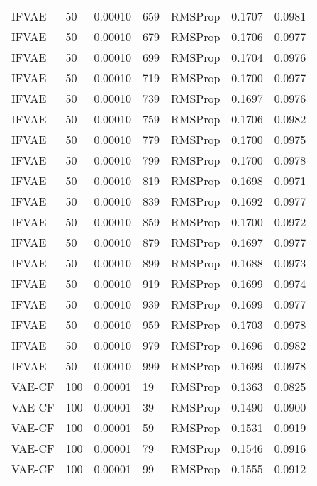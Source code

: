 \begin{tabular}{llrllrr}
   IFVAE &   50 &  0.00010 &   659 &   RMSProp &  0.1707 &       0.0981 \\
   IFVAE &   50 &  0.00010 &   679 &   RMSProp &  0.1706 &       0.0977 \\
   IFVAE &   50 &  0.00010 &   699 &   RMSProp &  0.1704 &       0.0976 \\
   IFVAE &   50 &  0.00010 &   719 &   RMSProp &  0.1700 &       0.0977 \\
   IFVAE &   50 &  0.00010 &   739 &   RMSProp &  0.1697 &       0.0976 \\
   IFVAE &   50 &  0.00010 &   759 &   RMSProp &  0.1706 &       0.0982 \\
   IFVAE &   50 &  0.00010 &   779 &   RMSProp &  0.1700 &       0.0975 \\
   IFVAE &   50 &  0.00010 &   799 &   RMSProp &  0.1700 &       0.0978 \\
   IFVAE &   50 &  0.00010 &   819 &   RMSProp &  0.1698 &       0.0971 \\
   IFVAE &   50 &  0.00010 &   839 &   RMSProp &  0.1692 &       0.0977 \\
   IFVAE &   50 &  0.00010 &   859 &   RMSProp &  0.1700 &       0.0972 \\
   IFVAE &   50 &  0.00010 &   879 &   RMSProp &  0.1697 &       0.0977 \\
   IFVAE &   50 &  0.00010 &   899 &   RMSProp &  0.1688 &       0.0973 \\
   IFVAE &   50 &  0.00010 &   919 &   RMSProp &  0.1699 &       0.0974 \\
   IFVAE &   50 &  0.00010 &   939 &   RMSProp &  0.1699 &       0.0977 \\
   IFVAE &   50 &  0.00010 &   959 &   RMSProp &  0.1703 &       0.0978 \\
   IFVAE &   50 &  0.00010 &   979 &   RMSProp &  0.1696 &       0.0982 \\
   IFVAE &   50 &  0.00010 &   999 &   RMSProp &  0.1699 &       0.0978 \\
  VAE-CF &  100 &  0.00001 &    19 &   RMSProp &  0.1363 &       0.0825 \\
  VAE-CF &  100 &  0.00001 &    39 &   RMSProp &  0.1490 &       0.0900 \\
  VAE-CF &  100 &  0.00001 &    59 &   RMSProp &  0.1531 &       0.0919 \\
  VAE-CF &  100 &  0.00001 &    79 &   RMSProp &  0.1546 &       0.0916 \\
  VAE-CF &  100 &  0.00001 &    99 &   RMSProp &  0.1555 &       0.0912 \\

\end{tabular}
